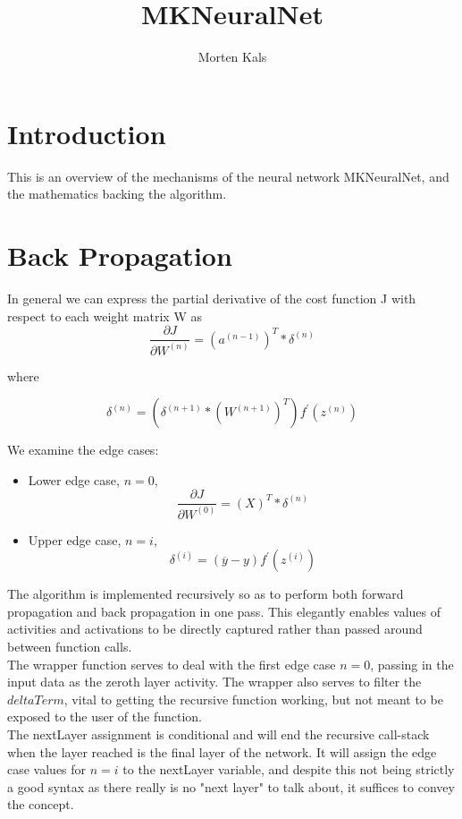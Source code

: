 \documentclass[11pt]{article}
\begin{document}
\title{MKNeuralNet}
\author{Morten Kals}
\maketitle

\section{Introduction}
This is an overview of the mechanisms of the neural network MKNeuralNet, and the mathematics backing the algorithm.  

\section{Back Propagation}

In general we can express the partial derivative of the cost function J with respect to each weight matrix W as
\[ 
\frac{\partial J }{\partial W^{(n)}} = \left ( a^{(n-1)} \right ) ^T * \delta ^{(n)} 
\]

where 

\[
\delta ^{(n)} = \left( \delta ^{(n+1)} * \left(W^{(n+1)}\right) ^T \right ) f^\prime (z^{(n)})
\]

We examine the edge cases: 

\begin{itemize}

	\item Lower edge case, $ n = 0 $, 
\[
\frac{\partial J }{\partial W^{(0)}} = \left( X \right) ^T * \delta ^{(n)} 
\]

	\item Upper edge case, $ n = i $, 
\[
\delta ^{(i)} = (\overline y - y ) f^\prime (z^{(i)})
\]

\end{itemize}


The algorithm is implemented recursively so as to perform both forward propagation and back propagation in one pass. This elegantly enables values of activities and activations to be directly captured rather than passed around between function calls. \\

The wrapper function serves to deal with the first edge case $n=0$, passing in the input data as the zeroth layer activity. The wrapper also serves to filter the $deltaTerm$, vital to getting the recursive function working, but not meant to be exposed to the user of the function. \\

The nextLayer assignment is conditional and will end the recursive call-stack when the layer reached is the final layer of the network. It will assign the edge case values for $n = i$ to the nextLayer variable, and despite this not being strictly a good syntax as there really is no "next layer" to talk about, it suffices to convey the concept. \\
 
\end{document}

